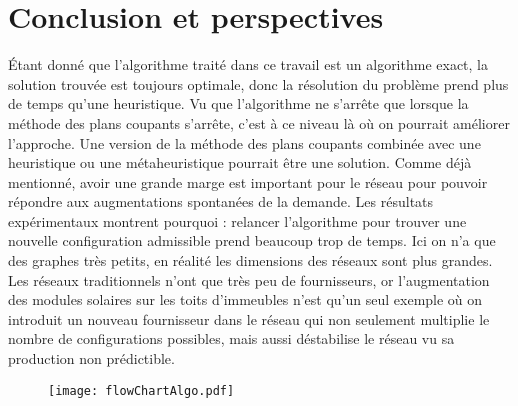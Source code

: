 \documentclass[letterpaper]{article}
\begin{document}
\section{Conclusion et perspectives}
Étant donné que l'algorithme traité dans ce travail est un algorithme exact, la solution trouvée est toujours optimale, donc la résolution du problème prend plus de temps qu'une heuristique. Vu que l'algorithme ne s'arrête que lorsque la méthode des plans coupants s'arrête, c'est à ce niveau là où on pourrait améliorer l'approche. Une version de la méthode des plans coupants combinée avec une heuristique ou une métaheuristique pourrait être une solution.\newline \indent
Comme déjà mentionné, avoir une grande marge est important pour le réseau pour pouvoir répondre aux augmentations spontanées de la demande. Les résultats expérimentaux montrent pourquoi : relancer l'algorithme pour trouver une nouvelle configuration admissible prend beaucoup trop de temps. Ici on n'a que des graphes très petits, en réalité les dimensions des réseaux sont plus grandes. Les réseaux traditionnels n'ont que très peu de fournisseurs, or l'augmentation des modules solaires sur les toits d'immeubles n'est qu'un seul exemple où on introduit un nouveau fournisseur dans le réseau qui non seulement multiplie le nombre de configurations possibles, mais aussi déstabilise le réseau vu sa production non prédictible. 

\begin{figure}[h]
    \centering
    \texttt{[image: flowChartAlgo.pdf]}
    \label{fig:algo}
\end{figure}




\end{document}
